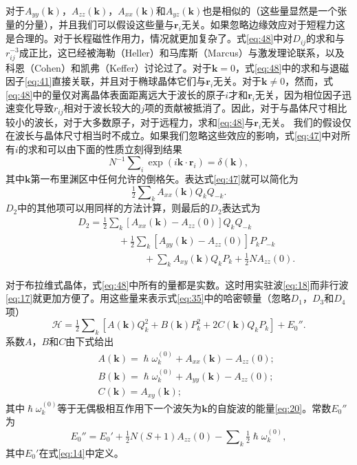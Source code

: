 \documentclass{article}
\begin{document}
对于$A_{yy}(\mathbf{k})$，$A_{zz}(\mathbf{k})$，$A_{xx}(\mathbf{k})$和$A_{yz}(\mathbf{k})$也是相似的（这些量显然是一个张量的分量），并且我们可以假设这些量与$\mathbf{r}_i$无关。如果忽略边缘效应对于短程力这是合理的。对于长程磁性作用力，情况就更加复杂了。式\eqref{eq:48}中对$D_{ij}$的求和与$r_{ij}^{-3}$成正比，这已经被海勒（Heller）和马库斯（Marcus）与激发理论联系，以及科恩（Cohen）和凯弗（Keffer）讨论过了。对于$\mathbf{k}=0$，式\eqref{eq:48}中的求和与退磁因子\eqref{eq:41}直接关联，并且对于椭球晶体它们与$\mathbf{r}_i$无关。对于$\mathbf{k}\neq 0$，然而，式\eqref{eq:48}中的量仅对离晶体表面距离远大于波长的原子$i$才和$\mathbf{r}_i$无关，因为相位因子迅速变化导致$r_{ij}$相对于波长较大的$j$项的贡献被抵消了。因此，对于与晶体尺寸相比较小的波长，对于大多数原子，对于远程力，求和\eqref{eq:48}与$\mathbf{r}_i$无关。 我们的假设仅在波长与晶体尺寸相当时不成立。如果我们忽略这些效应的影响，式\eqref{eq:47}中对所有$i$的求和可以由下面的性质立刻得到结果
\begin{equation} \label{eq:49}
N^{-1}\sum\nolimits_i\exp(i\mathbf{k}\cdot\mathbf{r}_i)=\delta(\mathbf{k}),
\end{equation}
其中$\mathbf{k}$第一布里渊区中任何允许的倒格矢。表达式\eqref{eq:47}就可以简化为
\begin{equation} \label{eq:50}
\tfrac{1}{2}\sum\nolimits_kA_{xx}(\mathbf{k})Q_kQ_{-k}.
\end{equation}
$D_2$中的其他项可以用同样的方法计算，则最后的$D_2$表达式为
\begin{eqnarray} \label{eq:51}
&&D_2=\tfrac{1}{2}\sum\nolimits_k[A_{xx}(\mathbf{k})-A_{zz}(0)]Q_kQ_{-k}\nonumber\\
&&\phantom{~~~~~~~~~~~~~~~~~~~}+\tfrac{1}{2}\sum\nolimits_k[A_{yy}(\mathbf{k})-A_{zz}(0)]P_kP_{-k}\nonumber\\
&&\phantom{~~~~~~~~~~~~~~~~~~~~~~~~~~~~~~~}+\sum\nolimits_kA_{xy}(\mathbf{k})Q_kP_k+\tfrac{1}{2}NA_{zz}(0).
\end{eqnarray}

对于布拉维式晶体，式\eqref{eq:48}中所有的量都是实数。这时用实驻波\eqref{eq:18}而非行波\eqref{eq:17}就更加方便了。用这些量来表示式\eqref{eq:35}中的哈密顿量（忽略$D_1$，$D_3$和$D_4$项）
\begin{equation} \label{eq:52}
\mathcal{H}=\tfrac{1}{2}\sum\nolimits_k[A(\mathbf{k})Q_k^2+B(\mathbf{k})P_k^2+2C(\mathbf{k})Q_kP_k]+E_0''.
\end{equation}
系数$A$，$B$和$C$由下式给出
\begin{eqnarray} 
&&A(\mathbf{k})=\hslash\omega_k^{(0)}+A_{xx}(\mathbf{k})-A_{zz}(0); \label{eq:53}\\
&&B(\mathbf{k})=\hslash\omega_k^{(0)}+A_{yy}(\mathbf{k})-A_{zz}(0); \label{eq:54}\\
&&C(\mathbf{k})=A_{xy}(\mathbf{k}); \label{eq:55}
\end{eqnarray}
其中$\hslash\omega_k^{(0)}$等于无偶极相互作用下一个波矢为$\mathbf{k}$的自旋波的能量\eqref{eq:20}。常数$E_0''$为
\begin{equation} \label{eq:56}
E_0''=E_0'+\tfrac{1}{2}N(S+1)A_{zz}(0)-\sum\nolimits_k\tfrac{1}{2}\hslash\omega_k^{(0)},
\end{equation}
其中$E_0'$在式\eqref{eq:14}中定义。
\end{document}
